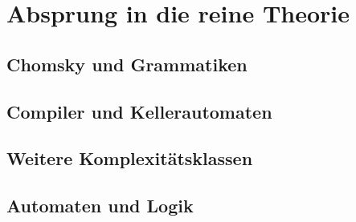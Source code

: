 \chapter{Absprung in die reine Theorie}
\section{Chomsky und Grammatiken}\label{chmoskyUndGrammatiken}
\section{Compiler und Kellerautomaten}
\section{Weitere Komplexitätsklassen}
\section{Automaten und Logik}
